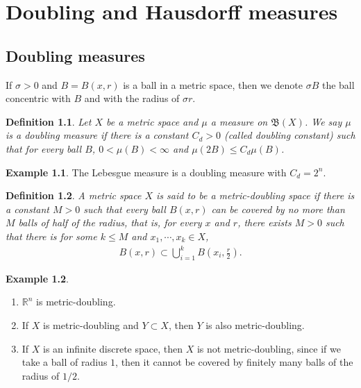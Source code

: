 \documentclass[11pt]{book}
\newtheorem{definition}{Definition}[chapter]
\theoremstyle{definition}
\newtheorem{example}{Example}[chapter]
\numberwithin{equation}{chapter}
\begin{document}
\medskip




\chapter{Doubling and Hausdorff measures}

\section{Doubling measures}

If $\sigma > 0$ and $B = B(x,r)$ is a ball in a metric space,  then we denote $\sigma B$ the ball concentric with $B$ and with the radius of $\sigma r$.

\medskip

\begin{definition}
Let $X$ be a metric space and $\mu$ a measure on $\mathfrak{B}(X)$. We say $\mu$ is a doubling measure if there is a constant $C_d > 0$ (called doubling constant) such that for every ball $B$, $0 < \mu(B) < \infty$ and $\mu(2B) \leq C_d \mu(B)$.
\end{definition}

\medskip

\begin{example}\label{example_51}
The Lebesgue measure is a doubling measure with $C_d = 2^n$.
\end{example}

\medskip

\begin{definition}
A metric space $X$ is said to be a metric-doubling space if there is a constant $M > 0$ such that every ball $B(x,r)$ can be covered by no more than $M$ balls of half of the radius, that is, for every $x$ and $r$, there exists $M > 0$ such that there is for some $k \leq M$ and $x_1, \cdots, x_k \in X$,
\begin{align*}
    B(x,r) \subset \bigcup^k_{i=1} B\left(x_i, \frac{r}{2}\right).
\end{align*}
\end{definition}

\medskip

\begin{example}
~\begin{enumerate}[label=(\alph*)]
    \item $\mathbb{R}^n$ is metric-doubling.
    
    \item If $X$ is metric-doubling and $Y \subset X$, then $Y$ is also metric-doubling.
    
    \item If $X$ is an infinite discrete space, then $X$ is not metric-doubling, since if we take a ball of radius $1$, then it cannot be covered by finitely many balls of the radius of $1/2$.
\end{enumerate}
\end{example}
\end{document}
